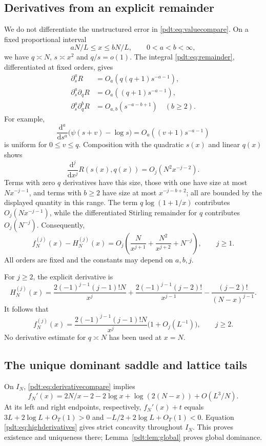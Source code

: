\subsection{Derivatives from an explicit remainder}
We do not differentiate the unstructured error in \eqref{pdt:eq:valuecompare}. On a fixed proportional interval
\[
 aN/L\le x\le bN/L,\qquad 0<a<b<\infty,
\]
we have $q\asymp N$, $s\asymp x^2$ and $q/s=o(1)$. The integral \eqref{pdt:eq:remainder}, differentiated at fixed orders, gives
\begin{align*}
 \partial_s^aR&=O_a(q(q+1)s^{-a-1}),\\
 \partial_s^a\partial_qR&=O_a((q+1)s^{-a-1}),\\
 \partial_s^a\partial_q^bR&=O_{a,b}(s^{-a-b+1})\quad(b\ge2).
\end{align*}
For example,
\[
 \frac{\mathrm d^a}{\mathrm ds^a}\bigl(\psi(s+v)-\log s\bigr)
       =O_a((v+1)s^{-a-1})
\]
is uniform for $0\le v\le q$. Composition with the quadratic $s(x)$ and linear $q(x)$ shows
\[
 \frac{\mathrm d^j}{\mathrm dx^j}R(s(x),q(x))=O_j(N^2x^{-j-2}).
\]
Terms with zero $q$ derivatives have this size, those with one have size at most $Nx^{-j-1}$, and terms with $b\ge2$ have size at most $x^{-j-b+2}$; all are bounded by the displayed quantity in this range. The term $q\log(1+1/x)$ contributes $O_j(Nx^{-j-1})$, while the differentiated Stirling remainder for $q$ contributes $O_j(N^{-j})$. Consequently,
\begin{equation}\label{pdt:eq:derivativecompare}
 f_N^{(j)}(x)-H_N^{(j)}(x)
 =O_j\!\left(\frac N{x^{j+1}}+\frac{N^2}{x^{j+2}}+N^{-j}\right),\qquad j\ge1.
\end{equation}
All orders are fixed and the constants may depend on $a,b,j$.

For $j\ge2$, the explicit derivative is
\begin{equation}\label{pdt:eq:Hderivatives}
 H_N^{(j)}(x)=\frac{2(-1)^{j-1}(j-1)!N}{x^j}
 +\frac{2(-1)^{j-1}(j-2)!}{x^{j-1}}
 -\frac{(j-2)!}{(N-x)^{j-1}}.
\end{equation}
It follows that
\begin{equation}\label{pdt:eq:highderivatives}
 f_N^{(j)}(x)=\frac{2(-1)^{j-1}(j-1)!N}{x^j}
             \bigl(1+O_j(L^{-1})\bigr),\qquad j\ge2.
\end{equation}
No derivative estimate for $q\asymp N$ has been used at $x=N$.

\subsection{The unique dominant saddle and lattice tails}
On $I_N$, \eqref{pdt:eq:derivativecompare} implies
\[
 f_N'(x)=2N/x-2-2\log x+\log(2(N-x))+O(L^3/N).
\]
At its left and right endpoints, respectively, $f_N'(x)+t$ equals
$3L+2\log L+O_T(1)>0$ and $-L/2+2\log L+O_T(1)<0$.
Equation \eqref{pdt:eq:highderivatives} gives strict concavity throughout $I_N$.
This proves existence and uniqueness there; Lemma~\ref{pdt:lem:global} proves global dominance.

